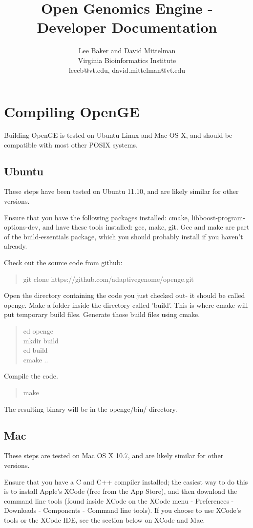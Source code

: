 \documentclass[11pt]{article}
\newcommand {\cmd}[1] {\begin{quote}#1\end{quote}}
\begin{document}
\title{Open Genomics Engine - Developer Documentation}
\author{Lee Baker and David Mittelman\\
Virginia Bioinformatics Institute \\
leecb@vt.edu, david.mittelman@vt.edu}
\maketitle

\section {Compiling OpenGE}
Building OpenGE is tested on Ubuntu Linux and Mac OS X, and should be compatible with most other POSIX systems.

\subsection{Ubuntu}
These steps have been tested on Ubuntu 11.10, and are likely similar for other versions.

Ensure that you have the following packages installed: cmake, libboost-program-options-dev, and have these tools installed: gcc, make, git. Gcc and make are part of the build-essentials package, which you should probably install if you haven't already.

Check out the source code from github:
\cmd{git clone https://github.com/adaptivegenome/openge.git}

Open the directory containing the code you just checked out- it should be called openge. Make a folder inside the directory called 'build'. This is where cmake will put temporary build files. Generate those build files using cmake.
\cmd{cd openge\\mkdir build\\cd build\\cmake ..}

Compile the code.
\cmd{make}
The resulting binary will be in the openge/bin/ directory.

\subsection{Mac}
These steps are tested on Mac OS X 10.7, and are likely similar for other versions.

Ensure that you have a C and C++ compiler installed; the easiest way to do this is to install Apple's XCode (free from the App Store), and then download the command line tools (found inside XCode on the XCode menu - Preferences - Downloads - Components - Command line tools). If you choose to use XCode's tools or the XCode IDE, see the section below on XCode and Mac.
\end{document}

